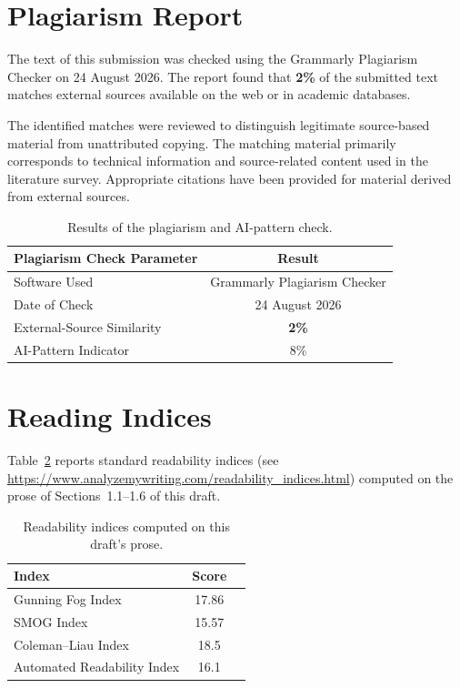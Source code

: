 \documentclass[12pt,a4paper]{article}
\begin{document}
\appendix
\section{Plagiarism Report}
\label{app:plagiarism}

The text of this submission was checked using the Grammarly Plagiarism
Checker on 24 August 2026. The report found that \textbf{2\%} of the
submitted text matches external sources available on the web or in
academic databases.

The identified matches were reviewed to distinguish legitimate
source-based material from unattributed copying. The matching material
primarily corresponds to technical information and source-related
content used in the literature survey. Appropriate citations have been
provided for material derived from external sources.

\begin{table}[H]
\centering
\small
\renewcommand{\arraystretch}{1.3}
\begin{tabular}{lc}
\toprule
\textbf{Plagiarism Check Parameter} & \textbf{Result} \\
\midrule
Software Used & Grammarly Plagiarism Checker \\
Date of Check & 24 August 2026 \\
External-Source Similarity & \textbf{2\%} \\
AI-Pattern Indicator & 8\% \\
\bottomrule
\end{tabular}
\caption{Results of the plagiarism and AI-pattern check.}
\label{tab:plagiarism}
\end{table}

\section{Reading Indices}
\label{app:readability}
Table~\ref{tab:readability} reports standard readability indices (see
\url{https://www.analyzemywriting.com/readability_indices.html})
computed on the prose of Sections~1.1--1.6 of this draft.

\begin{table}[h!]
\centering
\small
\begin{tabular}{lcl}
\toprule
Index & Score \\
\midrule
Gunning Fog Index          & 17.86 &\\
SMOG Index                 & 15.57 & \\
Coleman--Liau Index        & 18.5 &  \\
Automated Readability Index & 16.1 & \\
\bottomrule
\end{tabular}
\caption{Readability indices computed on this draft's prose.}
\label{tab:readability}
\end{table}
\end{document}
